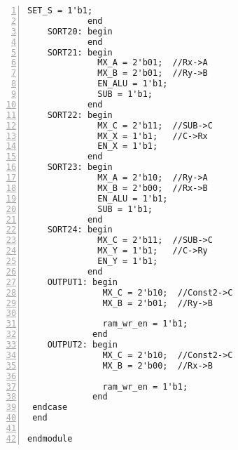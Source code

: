 \begin{lstlisting}[numbers=left,xleftmargin=1em, multicols=2,frame=leftline, basicstyle = \small\ttfamily]
              SET_S = 1'b1;
            end
    SORT20: begin
            end
    SORT21: begin
              MX_A = 2'b01;  //Rx->A
              MX_B = 2'b01;  //Ry->B
              EN_ALU = 1'b1;
              SUB = 1'b1;
            end
    SORT22: begin
              MX_C = 2'b11;  //SUB->C
              MX_X = 1'b1;   //C->Rx
              EN_X = 1'b1;
            end
    SORT23: begin
              MX_A = 2'b10;  //Ry->A
              MX_B = 2'b00;  //Rx->B
              EN_ALU = 1'b1;
              SUB = 1'b1;
            end
    SORT24: begin
              MX_C = 2'b11;  //SUB->C
              MX_Y = 1'b1;   //C->Ry
              EN_Y = 1'b1;				 
            end				   
    OUTPUT1: begin
               MX_C = 2'b10;  //Const2->C
               MX_B = 2'b01;  //Ry->B
                      
               ram_wr_en = 1'b1;
             end
    OUTPUT2: begin
               MX_C = 2'b10;  //Const2->C
               MX_B = 2'b00;  //Rx->B
                      
               ram_wr_en = 1'b1;
             end
 endcase
 end
    
endmodule
\end{lstlisting}


